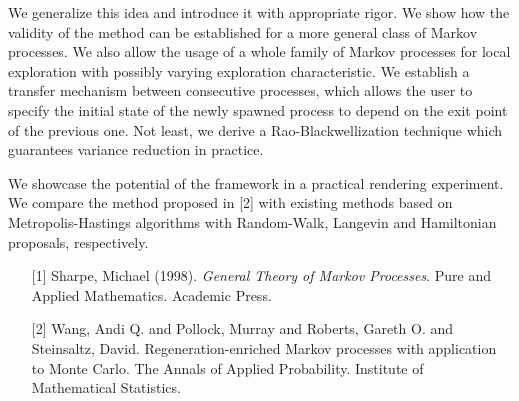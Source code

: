 \begin{talk}
We generalize this idea and introduce it with appropriate rigor. We show how the validity of the method can be established for a more general class of Markov processes. We also allow the usage of a whole family of Markov processes for local exploration with possibly varying exploration characteristic. We establish a transfer mechanism between consecutive processes, which allows the user to specify the initial state of the newly spawned process to depend on the exit point of the previous one. Not least, we derive a Rao-Blackwellization technique which guarantees variance reduction in practice.

We showcase the potential of the framework in a practical rendering experiment. We compare the method proposed in [2] with existing methods based on Metropolis-Hastings algorithms with Random-Walk, Langevin and Hamiltonian proposals, respectively.

\medskip

\begin{enumerate}
	\item[{[1]}] Sharpe, Michael (1998). {\it General Theory of Markov Processes}. Pure and Applied Mathematics. Academic Press.
	\item[{[2]}] Wang, Andi Q. and Pollock, Murray and Roberts, Gareth O. and Steinsaltz, David. Regeneration-enriched Markov processes with application to Monte Carlo. The Annals of Applied Probability. Institute of Mathematical Statistics.
\end{enumerate}

\end{talk}

